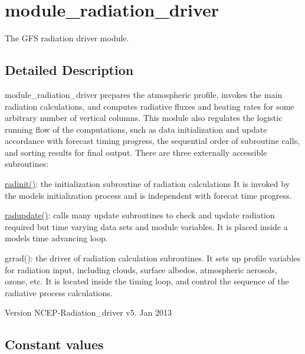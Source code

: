 \hypertarget{group__module__radiation__driver}{}\section{module\+\_\+radiation\+\_\+driver}
\label{group__module__radiation__driver}


The G\+FS radiation driver module.  




\subsection{Detailed Description}
module\+\_\+radiation\+\_\+driver prepares the atmospheric profile, invokes the main radiation calculations, and computes radiative fluxes and heating rates for some arbitrary number of vertical columns. This module also regulates the logistic running flow of the computations, such as data initialization and update accordance with forecast timing progress, the sequential order of subroutine calls, and sorting results for final output. There are three externally accessible subroutines\+:
\begin{DoxyItemize}
\item \hyperlink{group__module__radiation__driver_ga3d4ef1d77b7d7ef09fafcb4413e1cbf2}{radinit()}\+: the initialization subroutine of radiation calculations It is invoked by the model\textquotesingle{}s initialization process and is independent with forecat time progress.
\item \hyperlink{group__module__radiation__driver_ga28280ee9ea8ee0d183ab9d541a31b718}{radupdate()}\+: calls many update subroutines to check and update radiation required but time varying data sets and module variables. It is placed inside a model\textquotesingle{}s time advancing loop.
\item grrad()\+: the driver of radiation calculation subroutines. It sets up profile variables for radiation input, including clouds, surface albedos, atmospheric aerosols, ozone, etc. It is located inside the timing loop, and control the sequence of the radiative process calculations. \begin{DoxyVersion}{Version}
N\+C\+E\+P-\/\+Radiation\+\_\+driver v5. Jan 2013 
\end{DoxyVersion}

\end{DoxyItemize}\subsection*{Constant values}
